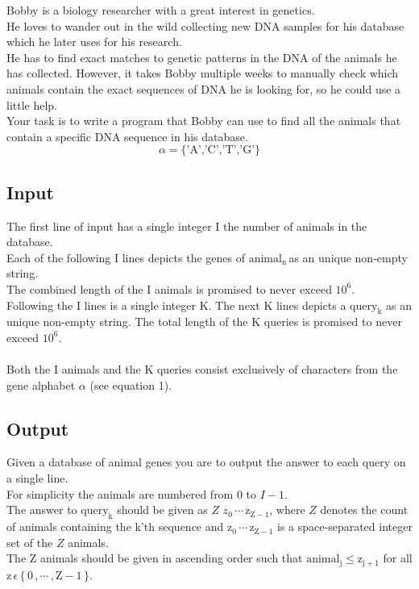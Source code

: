 \newcommand{\maxN}{10^6} %
\newcommand{\maxM}{10^6} %
\newcommand{\trm}{\textrm} %
\newcommand {\animN}{$\trm{animal}_\trm{n}\,$} %
Bobby is a biology researcher with a great interest in genetics. \\
He loves to wander out in the wild collecting new DNA samples for his database which he later uses for his research. \\
He has to find exact matches to genetic patterns in the DNA of the animals he has collected.
However, it takes Bobby multiple weeks to manually check which animals contain the exact sequences of DNA he is looking for, so he could use a little help. \\
Your task is to write a program that Bobby can use to find all the animals that contain a specific DNA sequence in his database.
\begin{equation}
\label{1}
\alpha =  \{\trm{'A','C','T','G'}\}
\end{equation}
\subsection*{Input}
The first line of input has a single integer $\trm{I}$ the number of animals in the database. \\
Each of the following $\trm{I}$ lines depicts the genes of \animN as an unique non-empty string. \\
The combined length of the $\trm{I}$ animals is promised to never exceed $\maxN$.
\\
Following the $\trm{I}$ lines is a single integer $\trm{K}$.
The next $\trm{K}$ lines depicts a $\trm{query}_\trm{k}$ as an unique non-empty string. The total length of the $\trm{K}$ queries is promised to never exceed $\maxM$. \\ \\
Both the $\trm{I}$ animals and the $\trm{K}$ queries consist exclusively of characters from the gene alphabet $\alpha$ (see equation 1). 

\subsection*{Output}
Given a database of animal genes you are to output the answer to each query on a single line. \\ 
For simplicity the animals are numbered from $0$ to $I-1$. \\ 
The answer to $\trm{query}_\trm{k}$ should be given as $Z \,\, z_0 \,\cdots \,\trm{z}_{\trm{Z}-1}$, where $Z$ denotes the count\\
of animals containing the \trm{k}'th sequence 
and $\trm{z}_0 \,\cdots \,\trm{z}_{\trm{Z}-1}$ is a space-separated integer set of the $Z$ animals. \\ 
The $\trm{Z}$ animals should be given in ascending order such that 
$\trm{animal}_\trm{j} \leq \trm{z}_{\trm{j}+1}$ for all $\trm{z} \, \epsilon \, \{\,0\,,\cdots\,,\trm{Z}-1\,\}$. 
